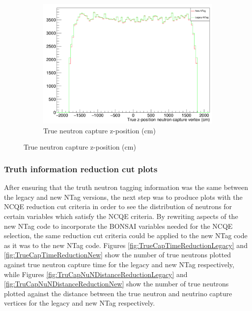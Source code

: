 \begin{figure}
\begin{subfigure}[b]{0.33\linewidth}
      \includegraphics[width=\linewidth]{Figures/TrueNCapZPos.PNG}
      \caption{True neutron capture z-position (cm)}
      \label{fig:TrueNCapZPos}
      \end{subfigure}
\end{figure}

\subsubsection{Truth information reduction cut plots}

After ensuring that the truth neutron tagging information was the same between the legacy and new NTag versions, the next step was to produce plots with the NCQE reduction cut criteria in order to see the distribution of neutrons for certain variables which satisfy the NCQE criteria. By rewriting aspects of the new NTag code to incorporate the BONSAI variables needed for the NCQE selection, the same reduction cut criteria could be applied to the new NTag code as it was to the new NTag code. Figures \ref{fig:TrueCapTimeReductionLegacy} and \ref{fig:TrueCapTimeReductionNew} show the number of true neutrons plotted against true neutron capture time for the legacy and new NTag respectively, while Figures \ref{fig:TruCapNuNDistanceReductionLegacy} and \ref{fig:TruCapNuNDistanceReductionNew} show the number of true neutrons plotted against the distance between the true neutron and neutrino capture vertices for the legacy and new NTag respectively.

